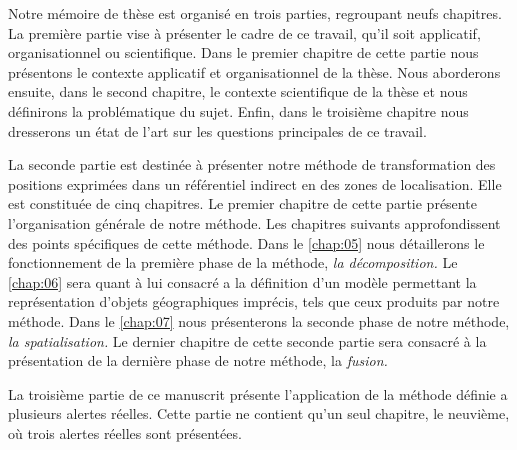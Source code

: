 
Notre mémoire de thèse est organisé en trois parties, regroupant neufs
chapitres. La première partie vise à présenter le cadre de ce travail,
qu'il soit applicatif, organisationnel ou scientifique.  Dans le
premier chapitre de cette partie nous présentons le contexte
applicatif et organisationnel de la thèse. Nous aborderons ensuite,
dans le second chapitre, le contexte scientifique de la thèse et nous
définirons la problématique du sujet. Enfin, dans le troisième
chapitre nous dresserons un état de l'art sur les questions
principales de ce travail.

La seconde partie est destinée à présenter notre méthode de
transformation des positions exprimées dans un référentiel indirect en
des zones de localisation. Elle est constituée de cinq chapitres. Le
premier chapitre de cette partie présente l’organisation générale de
notre méthode. Les chapitres suivants approfondissent des points
spécifiques de cette méthode. Dans le \autoref{chap:05} nous
détaillerons le fonctionnement de la première phase de la méthode,
\emph{la décomposition.} Le \autoref{chap:06} sera quant à lui
consacré a la définition d'un modèle permettant la représentation
d'objets géographiques imprécis, tels que ceux produits par notre
méthode. Dans le \autoref{chap:07} nous présenterons la seconde phase
de notre méthode, \emph{la spatialisation.} Le dernier chapitre de
cette seconde partie sera consacré à la présentation de la dernière
phase de notre méthode, la \emph{fusion.}

La troisième partie de ce manuscrit présente l’application de la
méthode définie a plusieurs alertes réelles. Cette partie ne contient
qu'un seul chapitre, le neuvième, où trois alertes réelles sont
présentées.



